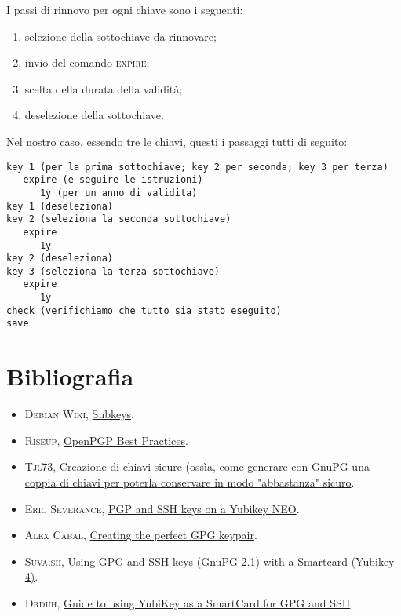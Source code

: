 \documentclass[a4paper,10pt]{article}
\begin{document}
I passi di rinnovo per ogni chiave sono i seguenti:

\begin{enumerate}
   \item selezione della sottochiave da rinnovare;
   \item invio del comando \textsc{expire};
   \item scelta della durata della validità;
   \item deselezione della sottochiave.
\end{enumerate}

Nel nostro caso, essendo tre le chiavi, questi i passaggi tutti di seguito:

\begin{lstlisting}
key 1 (per la prima sottochiave; key 2 per seconda; key 3 per terza)
   expire (e seguire le istruzioni)
      1y (per un anno di validita)
key 1 (deseleziona)
key 2 (seleziona la seconda sottochiave)
   expire
      1y
key 2 (deseleziona)
key 3 (seleziona la terza sottochiave)
   expire
      1y
check (verifichiamo che tutto sia stato eseguito)
save
\end{lstlisting}

\section{Bibliografia}

\begin{itemize}
   \item \textsc{Debian Wiki}, \href{https://wiki.debian.org/Subkeys}{Subkeys}.
   \item \textsc{Riseup}, \href{https://riseup.net/en/security/message-security/openpgp/best-practices}{OpenPGP Best Practices}.
   \item \textsc{Tjl73}, \href{http://tjl73.altervista.org/secure_keygen/}{Creazione di chiavi sicure (ossìa, come generare con GnuPG una coppia di chiavi per poterla conservare in modo "abbastanza" sicuro}.
   \item \textsc{Eric Severance}, \href{https://www.esev.com/blog/post/2015-01-pgp-ssh-key-on-yubikey-neo/}{PGP and SSH keys on a Yubikey NEO}.
   \item \textsc{Alex Cabal}, \href{https://alexcabal.com/creating-the-perfect-gpg-keypair/}{Creating the perfect GPG keypair}.
   \item \textsc{Suva.sh}, \href{https://suva.sh/posts/gpg-ssh-smartcard-yubikey-keybase/}{Using GPG and SSH keys (GnuPG 2.1) with a Smartcard (Yubikey 4)}.
   \item \textsc{Drduh}, \href{https://github.com/drduh/YubiKey-Guide}{Guide to using YubiKey as a SmartCard for GPG and SSH}.
\end{itemize}
\end{document}
